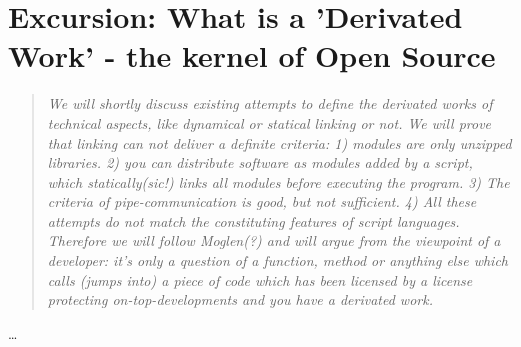 %
%
%
%
%



\section{Excursion: What is a 'Derivated Work' - the kernel of Open Source}
\footnotesize
\begin{quote}\itshape
We will shortly discuss existing attempts to define the derivated works of
technical aspects, like dynamical or statical linking or not. We will
prove that linking can not deliver a definite criteria: 1) modules are only
unzipped libraries. 2) you can distribute software as modules added by a script,
which statically(sic!) links all modules before executing the program. 3) The
criteria of pipe-communication is good, but not sufficient. 4) All these
attempts do not match the constituting features of script languages. Therefore we
will follow Moglen(?) and will argue from the viewpoint of a developer: it's
only a question of a function, method or anything else which calls (jumps into)
a piece of code which has been licensed by a license protecting
on-top-developments and you have a derivated work.
\end{quote}
\normalsize
\ldots


%
